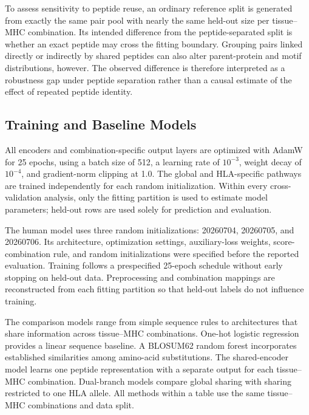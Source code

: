 To assess sensitivity to peptide reuse, an ordinary reference split is generated from exactly the same pair pool with nearly the same held-out size per tissue--MHC combination. Its intended difference from the peptide-separated split is whether an exact peptide may cross the fitting boundary. Grouping pairs linked directly or indirectly by shared peptides can also alter parent-protein and motif distributions, however. The observed difference is therefore interpreted as a robustness gap under peptide separation rather than a causal estimate of the effect of repeated peptide identity.

\subsection{Training and Baseline Models}

All encoders and combination-specific output layers are optimized with AdamW \cite{loshchilov2019adamw} for 25 epochs, using a batch size of 512, a learning rate of \(10^{-3}\), weight decay of \(10^{-4}\), and gradient-norm clipping at 1.0. The global and HLA-specific pathways are trained independently for each random initialization. Within every cross-validation analysis, only the fitting partition is used to estimate model parameters; held-out rows are used solely for prediction and evaluation.

The human model uses three random initializations: 20260704, 20260705, and 20260706. Its architecture, optimization settings, auxiliary-loss weights, score-combination rule, and random initializations were specified before the reported evaluation. Training follows a prespecified 25-epoch schedule without early stopping on held-out data. Preprocessing and combination mappings are reconstructed from each fitting partition so that held-out labels do not influence training.

The comparison models range from simple sequence rules to architectures that share information across tissue--MHC combinations. One-hot logistic regression provides a linear sequence baseline. A BLOSUM62 random forest incorporates established similarities among amino-acid substitutions. The shared-encoder model learns one peptide representation with a separate output for each tissue--MHC combination. Dual-branch models compare global sharing with sharing restricted to one HLA allele. All methods within a table use the same tissue--MHC combinations and data split.

